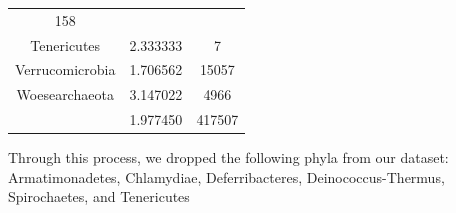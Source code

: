 \documentclass[12pt,twoside]{dukestatscithesis}
\begin{document}
\begin{longtable}[]{@{}ccc@{}}
\begin{minipage}[t]{0.28\columnwidth}
158\strut
\end{minipage}\tabularnewline
\begin{minipage}[t]{0.35\columnwidth}\centering\strut
Tenericutes\strut
\end{minipage} & \begin{minipage}[t]{0.28\columnwidth}\centering\strut
2.333333\strut
\end{minipage} & \begin{minipage}[t]{0.28\columnwidth}\centering\strut
7\strut
\end{minipage}\tabularnewline
\begin{minipage}[t]{0.35\columnwidth}\centering\strut
Verrucomicrobia\strut
\end{minipage} & \begin{minipage}[t]{0.28\columnwidth}\centering\strut
1.706562\strut
\end{minipage} & \begin{minipage}[t]{0.28\columnwidth}\centering\strut
15057\strut
\end{minipage}\tabularnewline
\begin{minipage}[t]{0.35\columnwidth}\centering\strut
Woesearchaeota\strut
\end{minipage} & \begin{minipage}[t]{0.28\columnwidth}\centering\strut
3.147022\strut
\end{minipage} & \begin{minipage}[t]{0.28\columnwidth}\centering\strut
4966\strut
\end{minipage}\tabularnewline
\begin{minipage}[t]{0.35\columnwidth}\centering\strut
\strut
\end{minipage} & \begin{minipage}[t]{0.28\columnwidth}\centering\strut
1.977450\strut
\end{minipage} & \begin{minipage}[t]{0.28\columnwidth}\centering\strut
417507\strut
\end{minipage}\tabularnewline
\bottomrule
\end{longtable}
Through this process, we dropped the following phyla from our dataset:
Armatimonadetes, Chlamydiae, Deferribacteres, Deinococcus-Thermus,
Spirochaetes, and Tenericutes
\end{document}
